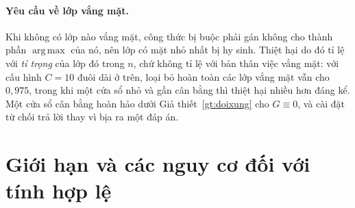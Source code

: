 \documentclass[11pt]{article}
\theoremstyle{remark}
\DeclareMathOperator*{\argmaxop}{arg\,max}
\begin{document}
\paragraph{Yêu cầu về lớp vắng mặt.}
Khi không có lớp nào vắng mặt, công thức bị buộc phải gán không cho thành
phần $\argmaxop$ của nó, nên lớp có mặt nhỏ nhất bị hy sinh. Thiệt hại do đó
tỉ lệ với \emph{tỉ trọng} của lớp đó trong $n$, chứ không tỉ lệ với bản thân
việc vắng mặt: với cấu hình $C=10$ đuôi dài ở trên, loại bỏ hoàn toàn các lớp
vắng mặt vẫn cho $0{,}975$, trong khi một cửa sổ nhỏ và gần cân bằng thì
thiệt hại nhiều hơn đáng kể. Một cửa sổ cân bằng hoàn hảo dưới
Giả thiết~\ref{gt:doixung} cho $G \equiv 0$, và cài đặt từ chối trả lời thay
vì bịa ra một đáp án.

\section{Giới hạn và các nguy cơ đối với tính hợp lệ}
\label{sec:gioihan}
\end{document}
